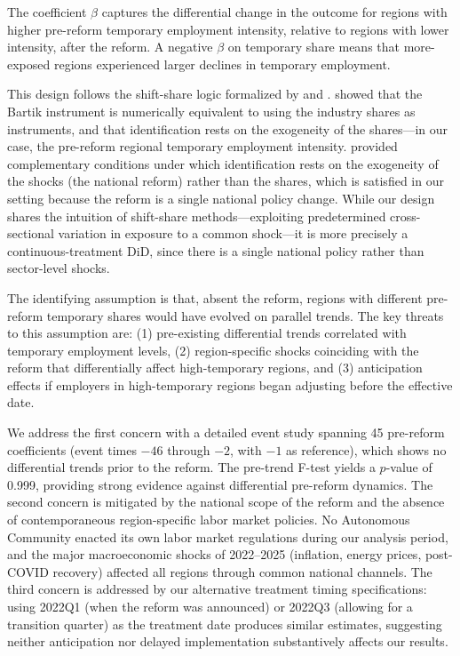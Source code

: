 \documentclass[12pt]{article}
\begin{document}
The coefficient $\beta$ captures the differential change in the outcome for regions with higher pre-reform temporary employment intensity, relative to regions with lower intensity, after the reform. A negative $\beta$ on temporary share means that more-exposed regions experienced larger declines in temporary employment.

This design follows the shift-share logic formalized by \citet{goldsmith2020bartik} and \citet{borusyak2022quasi}. \citet{goldsmith2020bartik} showed that the Bartik instrument is numerically equivalent to using the industry shares as instruments, and that identification rests on the exogeneity of the shares---in our case, the pre-reform regional temporary employment intensity. \citet{borusyak2022quasi} provided complementary conditions under which identification rests on the exogeneity of the shocks (the national reform) rather than the shares, which is satisfied in our setting because the reform is a single national policy change. While our design shares the intuition of shift-share methods---exploiting predetermined cross-sectional variation in exposure to a common shock---it is more precisely a continuous-treatment DiD, since there is a single national policy rather than sector-level shocks.

The identifying assumption is that, absent the reform, regions with different pre-reform temporary shares would have evolved on parallel trends. The key threats to this assumption are: (1) pre-existing differential trends correlated with temporary employment levels, (2) region-specific shocks coinciding with the reform that differentially affect high-temporary regions, and (3) anticipation effects if employers in high-temporary regions began adjusting before the effective date.

We address the first concern with a detailed event study spanning 45 pre-reform coefficients (event times $-46$ through $-2$, with $-1$ as reference), which shows no differential trends prior to the reform. The pre-trend F-test yields a $p$-value of 0.999, providing strong evidence against differential pre-reform dynamics. The second concern is mitigated by the national scope of the reform and the absence of contemporaneous region-specific labor market policies. No Autonomous Community enacted its own labor market regulations during our analysis period, and the major macroeconomic shocks of 2022--2025 (inflation, energy prices, post-COVID recovery) affected all regions through common national channels. The third concern is addressed by our alternative treatment timing specifications: using 2022Q1 (when the reform was announced) or 2022Q3 (allowing for a transition quarter) as the treatment date produces similar estimates, suggesting neither anticipation nor delayed implementation substantively affects our results.
\end{document}
